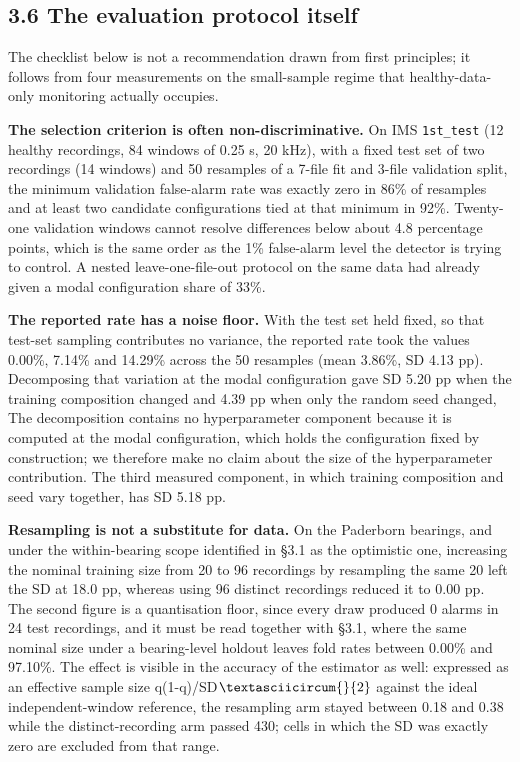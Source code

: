 \documentclass[11pt]{article}
\newcommand{\code}[1]{\texttt{#1}}
\begin{document}
\subsection{3.6 The evaluation protocol itself}

The checklist below is not a recommendation drawn from first principles; it follows from four measurements on the small-sample regime that healthy-data-only monitoring actually occupies.

\textbf{The selection criterion is often non-discriminative.} On IMS \code{1st\_test} (12 healthy recordings, 84 windows of 0.25 s, 20 kHz), with a fixed test set of two recordings (14 windows) and 50 resamples of a 7-file fit and 3-file validation split, the minimum validation false-alarm rate was exactly zero in 86\% of resamples and at least two candidate configurations tied at that minimum in 92\%. Twenty-one validation windows cannot resolve differences below about 4.8 percentage points, which is the same order as the 1\% false-alarm level the detector is trying to control. A nested leave-one-file-out protocol on the same data had already given a modal configuration share of 33\%.

\textbf{The reported rate has a noise floor.} With the test set held fixed, so that test-set sampling contributes no variance, the reported rate took the values 0.00\%, 7.14\% and 14.29\% across the 50 resamples (mean 3.86\%, SD 4.13 pp). Decomposing that variation at the modal configuration gave SD 5.20 pp when the training composition changed and 4.39 pp when only the random seed changed, The decomposition contains no hyperparameter component because it is computed at the modal configuration, which holds the configuration fixed by construction; we therefore make no claim about the size of the hyperparameter contribution. The third measured component, in which training composition and seed vary together, has SD 5.18 pp.

\textbf{Resampling is not a substitute for data.} On the Paderborn bearings, and under the within-bearing scope identified in \S3.1 as the optimistic one, increasing the nominal training size from 20 to 96 recordings by resampling the same 20 left the SD at 18.0 pp, whereas using 96 distinct recordings reduced it to 0.00 pp. The second figure is a quantisation floor, since every draw produced 0 alarms in 24 test recordings, and it must be read together with \S3.1, where the same nominal size under a bearing-level holdout leaves fold rates between 0.00\% and 97.10\%. The effect is visible in the accuracy of the estimator as well: expressed as an effective sample size q(1-q)/SD$\textasciicircum{}{2}$ against the ideal independent-window reference, the resampling arm stayed between 0.18 and 0.38 while the distinct-recording arm passed 430; cells in which the SD was exactly zero are excluded from that range.
\end{document}

